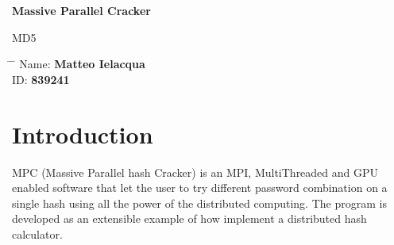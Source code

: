 \documentclass[12pt,a4paper]{article}
\title{}
\author{}
\date{}
\begin{document}
\newcommand{\subf}[2]{%
    {\small\begin{tabular}[t]{@{}c@{}}
                #1 \\#2
            \end{tabular}}%
}

\begin{titlepage}
    \begin{center}
        \vspace*{3cm}

        \Huge
        \textbf{Massive Parallel Cracker}

        \vspace{0.3cm}
        \Huge
        MD5

        \vspace{0.8cm}
        \large



        \vspace{0.5cm}
        \LARGE


        \vspace{1.5cm}

        \textbf{}

        \vfill



        \vspace{0.8cm}



        \Large




    \end{center}
    \Large
    \begin{tabbing}
        \hspace*{1em}\= \hspace*{8em} \= \kill %
        \> Name:\>  \textbf{Matteo Ielacqua} \\
        \> ID:\>  \textbf{839241} \\
    \end{tabbing}

\end{titlepage}


\section{Introduction}
MPC (Massive Parallel hash Cracker) is an MPI, MultiThreaded and GPU enabled software that let the user to try different password combination on a single hash using all the power of the distributed computing. The program is developed as an extensible example of how implement a distributed hash calculator.
\end{document}
